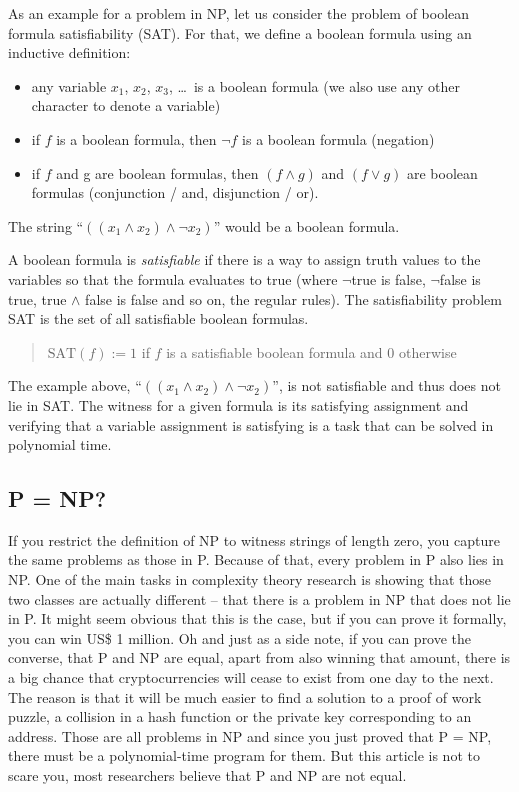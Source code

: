 \documentclass[11pt,letterpaper]{article}
\begin{document}
As an example for a problem in NP, let us consider the problem of boolean formula satisfiability (SAT). For that, we define a boolean formula using an inductive definition:
\begin{itemize}
\item any variable $x_{1}$, $x_{2}$, $x_{3}$, \dots \ is a boolean formula (we also use any other character to denote a variable)
\item if $f$ is a boolean formula, then $\neg f$ is a boolean formula (negation)
\item if $f$ and g are boolean formulas, then $(f \land g)$ and $(f \lor g)$ are boolean formulas (conjunction / and, disjunction / or).
\end{itemize}


The string ``$((x_{1}\land x_{2}) \land \neg x_{2})$'' would be a boolean formula.

A boolean formula is \textit{satisfiable} if there is a way to assign truth values to the variables so that the formula evaluates to true (where $\neg$true is false, $\neg$false is true, true $\land$ false is false and so on, the regular rules). The satisfiability problem SAT is the set of all satisfiable boolean formulas.
\begin{quote}
$\mathrm{SAT}(f) := 1$ if $f$ is a satisfiable boolean formula and $0$ otherwise
\end{quote}


The example above, ``$((x_{1}\land x_{2}) \land \neg x_{2})$'', is not satisfiable and thus does not lie in SAT. The witness for a given formula is its satisfying assignment and verifying that a variable assignment is satisfying is a task that can be solved in polynomial time.

\subsection{P = NP?}


If you restrict the definition of NP to witness strings of length zero, you capture the same problems as those in P. Because of that, every problem in P also lies in NP. One of the main tasks in complexity theory research is showing that those two classes are actually different -- that there is a problem in NP that does not lie in P. It might seem obvious that this is the case, but if you can prove it formally, you can win US\$ 1 million. Oh and just as a side note, if you can prove the converse, that P and NP are equal, apart from also winning that amount, there is a big chance that cryptocurrencies will cease to exist from one day to the next. The reason is that it will be much easier to find a solution to a proof of work puzzle, a collision in a hash function or the private key corresponding to an address. Those are all problems in NP and since you just proved that P = NP, there must be a polynomial-time program for them. But this article is not to scare you, most researchers believe that P and NP are not equal.
\end{document}
